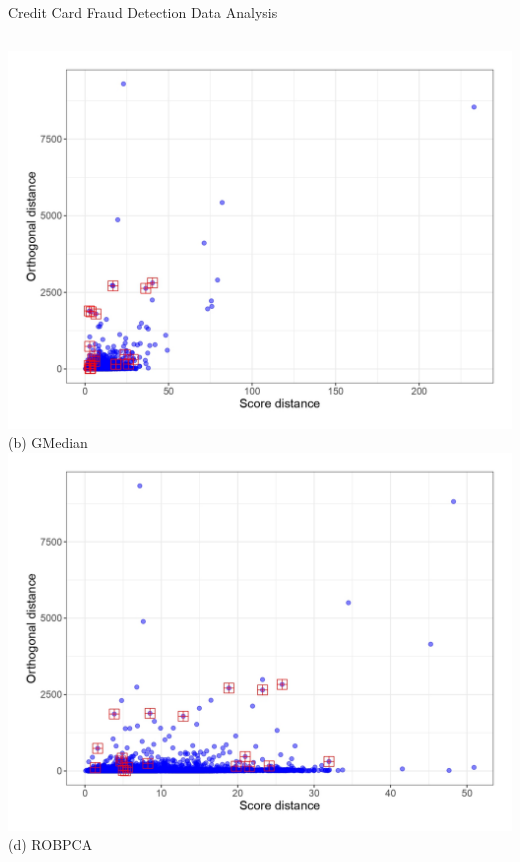\documentclass[10pt]{beamer}
\begin{document}
\begin{frame}{Credit Card Fraud Detection Data Analysis}
\begin{columns}
{        \includegraphics[width=\textwidth]{figures/rpcadpd/CCard-GMed.jpg}
        {\tiny (b) GMedian}
        \includegraphics[width=\textwidth]{figures/rpcadpd/CCard-ROBPCA.jpg}
        {\tiny (d) ROBPCA}
    }
\end{columns}
\end{frame}
\end{document}
